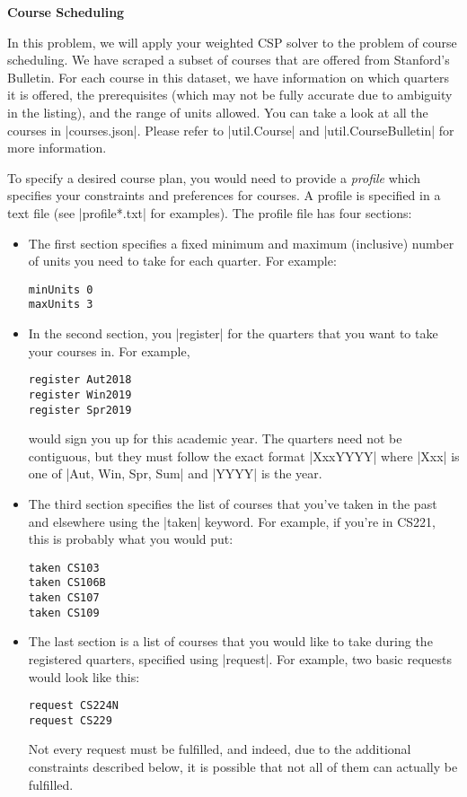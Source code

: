\item {\bf Course Scheduling}

In this problem, we will apply your weighted CSP solver to the problem of course
scheduling. We have scraped a subset of courses that are offered from Stanford's
Bulletin. For each course in this dataset, we have information on which quarters
it is offered, the prerequisites (which may not be fully accurate due to
ambiguity in the listing), and the range of units allowed. You can take a look
at all the courses in |courses.json|. Please refer to |util.Course| and
|util.CourseBulletin| for more information.

To specify a desired course plan, you would need to provide a {\em profile}
which specifies your constraints and preferences for courses. A profile is
specified in a text file (see |profile*.txt| for examples). The profile file has
four sections:
\begin{itemize}
  \item The first section specifies a fixed minimum and maximum (inclusive)
  number of units you need to take for each quarter. For example:
\begin{lstlisting}
minUnits 0
maxUnits 3
\end{lstlisting}

  \item In the second section, you |register| for the quarters that you want to
  take your courses in.  For example,
\begin{lstlisting}
register Aut2018
register Win2019
register Spr2019
\end{lstlisting}

  would sign you up for this academic year. The quarters need not be contiguous,
  but they must follow the exact format |XxxYYYY| where |Xxx| is one of
  |Aut, Win, Spr, Sum| and |YYYY| is the year.
  
  \item The third section specifies the list of courses that you've taken in the
  past and elsewhere using the |taken| keyword. For example, if you're in CS221,
  this is probably what you would put:
\begin{lstlisting}
taken CS103
taken CS106B
taken CS107
taken CS109
\end{lstlisting}

  \item The last section is a list of courses that you would like to take during
  the registered quarters, specified using |request|. For example, two basic
  requests would look like this:
\begin{lstlisting}
request CS224N
request CS229
\end{lstlisting}

Not every request must be fulfilled, and indeed, due to the additional
constraints described below, it is possible that not all of them can actually be
fulfilled.
\end{itemize}


